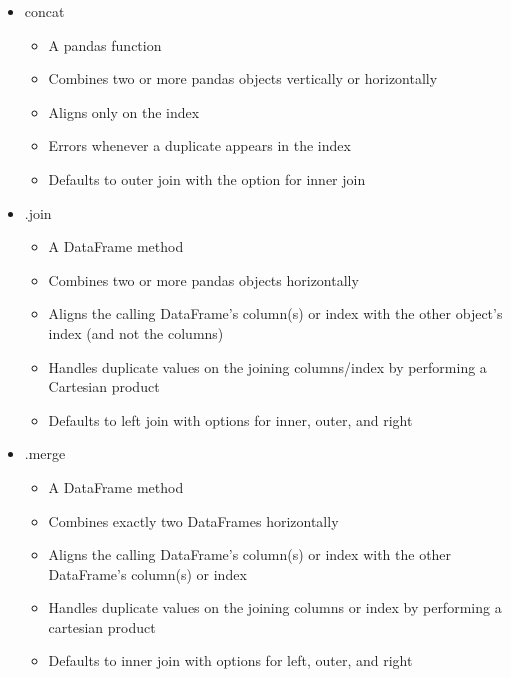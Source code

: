 \begin{itemize}
    \item concat
          \begin{itemize}
              \item A pandas function
              \item Combines two or more pandas objects vertically or horizontally
              \item Aligns only on the index
              \item Errors whenever a duplicate appears in the index
              \item Defaults to outer join with the option for inner join
          \end{itemize}
    \item .join
          \begin{itemize}
              \item A DataFrame method
              \item Combines two or more pandas objects horizontally
              \item Aligns the calling DataFrame's column(s) or index with the other object's index (and not the columns)
              \item Handles duplicate values on the joining columns/index by performing a Cartesian product
              \item Defaults to left join with options for inner, outer, and right
          \end{itemize}
    \item .merge
          \begin{itemize}
              \item A DataFrame method
              \item Combines exactly two DataFrames horizontally
              \item Aligns the calling DataFrame's column(s) or index with the other DataFrame's column(s) or index
              \item Handles duplicate values on the joining columns or index by performing a cartesian product
              \item Defaults to inner join with options for left, outer, and right
          \end{itemize}
\end{itemize}